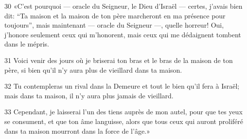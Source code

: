 
30 «C’est pourquoi --- oracle du Seigneur, le Dieu d’Israël --- certes, j’avais bien dit: “Ta maison et la maison de ton père marcheront en ma présence pour toujours”, mais maintenant --- oracle du Seigneur ---, quelle horreur! Oui, j’honore seulement ceux qui m’honorent, mais ceux qui me dédaignent tombent dans le mépris.

31 Voici venir des jours où je briserai ton bras et le bras de la maison de ton père, si bien qu’il n’y aura plus de vieillard dans ta maison.

32 Tu contempleras un rival dans la Demeure et tout le bien qu’il fera à Israël; mais dans ta maison, il n’y aura plus jamais de vieillard.

33 Cependant, je laisserai l’un des tiens auprès de mon autel, pour que tes yeux se consument, et que ton âme languisse, alors que tous ceux qui auront proliféré dans ta maison mourront dans la force de l’âge.»